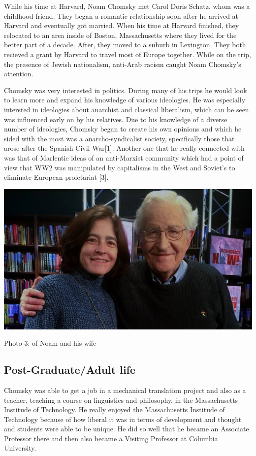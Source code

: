 \documentclass[conference]{IEEEtran}
\begin{document}
While his time at Harvard, Noam Chomsky met Carol Doris Schatz, whom was a childhood friend. They began a romantic relationship soon after he arrived at Harvard and eventually got married. When his time at Harvard finished, they relocated to an area inside of Boston, Massachusetts where they lived for the better part of a decade. After, they moved to a suburb in Lexington. They both recieved a grant by Harvard to travel most of Europe together. While on the trip, the presence of Jewish nationalism, anti-Arab racism caught Noam Chomsky's attention. 

Chomsky was very interested in politics. During many of his trips he would look to learn more and expand his knowledge of various ideologies. He was especially intersted in ideologies about anarchist and classical liberalism, which can be seen was influenced early on by his relatives. Due to his knowledge of a diverse number of ideologies, Chomsky began to create his own opinions and which he sided with the most was a anarcho-syndicalist society, specifically those that arose after the Spanish Civil War[1]. Another one that he really connected with was that of Marlentie ideas of an anti-Marxist community which had a point of view that WW2 was manipulated by capitalisms in the West and Soviet's to eliminate European proletariat [3]. \newline

\includegraphics[scale=.25]{wife.jpg} 

Photo 3: of Noam and his wife
\subsection{Post-Graduate/Adult life}

Chomsky was able to get a job in a mechanical translation project and also as a teacher, teaching a course on linguistics and philosophy, in the Massachusetts Institude of Technology. He really enjoyed the Massachusetts Institude of Technology because of how liberal it was in terms of development and thought and students were able to be unique. He did so well that he became an Associate Professor there and then also became a Visiting Professor at Columbia University. 
\end{document}
